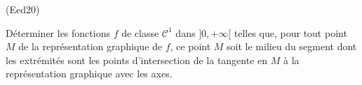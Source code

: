 \begin{tiny}(Eed20)\end{tiny} Déterminer les fonctions $f$ de classe $\mathcal{C}^1$ dans $]0,+\infty[$ telles que, pour tout point $M$ de la représentation graphique de $f$, ce point $M$ soit le milieu du segment dont les extrémités sont les points d'intersection de la tangente en $M$ à la représentation graphique avec les axes. 